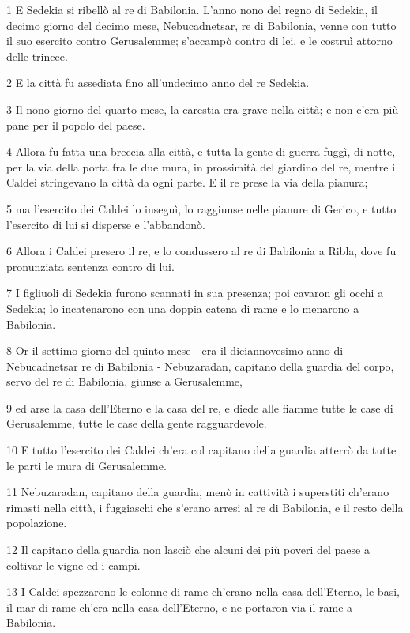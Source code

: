 \par 1 E Sedekia si ribellò al re di Babilonia. L'anno nono del regno di Sedekia, il decimo giorno del decimo mese, Nebucadnetsar, re di Babilonia, venne con tutto il suo esercito contro Gerusalemme; s'accampò contro di lei, e le costruì attorno delle trincee.
\par 2 E la città fu assediata fino all'undecimo anno del re Sedekia.
\par 3 Il nono giorno del quarto mese, la carestia era grave nella città; e non c'era più pane per il popolo del paese.
\par 4 Allora fu fatta una breccia alla città, e tutta la gente di guerra fuggì, di notte, per la via della porta fra le due mura, in prossimità del giardino del re, mentre i Caldei stringevano la città da ogni parte. E il re prese la via della pianura;
\par 5 ma l'esercito dei Caldei lo inseguì, lo raggiunse nelle pianure di Gerico, e tutto l'esercito di lui si disperse e l'abbandonò.
\par 6 Allora i Caldei presero il re, e lo condussero al re di Babilonia a Ribla, dove fu pronunziata sentenza contro di lui.
\par 7 I figliuoli di Sedekia furono scannati in sua presenza; poi cavaron gli occhi a Sedekia; lo incatenarono con una doppia catena di rame e lo menarono a Babilonia.
\par 8 Or il settimo giorno del quinto mese - era il diciannovesimo anno di Nebucadnetsar re di Babilonia - Nebuzaradan, capitano della guardia del corpo, servo del re di Babilonia, giunse a Gerusalemme,
\par 9 ed arse la casa dell'Eterno e la casa del re, e diede alle fiamme tutte le case di Gerusalemme, tutte le case della gente ragguardevole.
\par 10 E tutto l'esercito dei Caldei ch'era col capitano della guardia atterrò da tutte le parti le mura di Gerusalemme.
\par 11 Nebuzaradan, capitano della guardia, menò in cattività i superstiti ch'erano rimasti nella città, i fuggiaschi che s'erano arresi al re di Babilonia, e il resto della popolazione.
\par 12 Il capitano della guardia non lasciò che alcuni dei più poveri del paese a coltivar le vigne ed i campi.
\par 13 I Caldei spezzarono le colonne di rame ch'erano nella casa dell'Eterno, le basi, il mar di rame ch'era nella casa dell'Eterno, e ne portaron via il rame a Babilonia.

